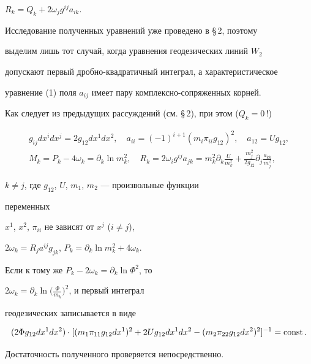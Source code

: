 $R_k=Q_k+2\omega_j g^{ij}a_{ik}$. 


 


Исследование полученных уравнений уже проведено в \S\,2, поэтому 


выделим лишь тот случай, когда уравнения геодезических линий $W_2$ 


допускают первый дробно-квадратичный интеграл, а характеристическое  


уравнение (1) поля $a_{ij}$ имеет пару комплексно-сопряженных корней. 


Как следует из предыдущих рассуждений (см. \S\,2), при этом ($Q_k=0$\,!) 


\begin{gather*} 


g_{ij}dx^i dx^j=2g_{12}dx^1dx^2,\quad 


a_{ii}=(-1)^{i+1}(m_i\pi_{ii}g_{12})^2,\quad 


a_{12}=U g_{12},\\ 


%


M_k=P_k-4\omega_k=\partial_k\ln m^2_k,\quad 


R_k=2\omega_i g^{ij}a_{jk}=m^2_k 


\partial_k\frac{U}{m^2_k}+\frac{m^2_j}{2g_{12}} 


\partial_j\frac{a_{kk}}{m^2_j}, 


\end{gather*} 


$k\ne j$, где $g_{12}$, $U$, $m_1$, $m_2$ --- произвольные функции 


переменных 


$x^1$, $x^2$, $\pi_{ii}$ не зависят от $x^j$ ($i\ne j$), 


$2\omega_k=R_j a^{ij}g_{jk}$, $P_k=\partial_k\ln m^2_k+4\omega_k$. 


Если к тому же $P_k-2\omega_k=\partial_k\ln\Phi^2$, то 


$2\omega_k=\partial_k\ln\big(\frac{\Phi}{m_k}\Big)^2$, и первый интеграл 


геодезических записывается в виде


$$ 


(2\Phi g_{12}dx^1dx^2)\cdot[(m_1\pi_{11}g_{12}dx^1)^2+ 


2U g_{12}dx^1dx^2-(m_2\pi_{22}g_{12}dx^2)^2]^{-1}=\const. 


$$ 


 


Достаточность полученного проверяется непосредственно. 


